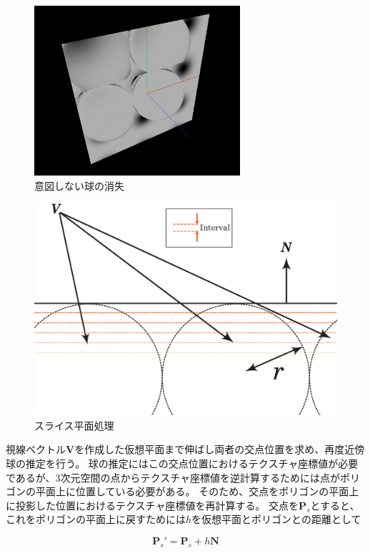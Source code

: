 \begin{figure}[htbp]
  \centering
  \includegraphics[width=3.0in]{./img/four_sphere_negative.png}
  \caption{意図しない球の消失}
  \label{FFourSphereNegative}
\end{figure}
\begin{figure}[htbp]
  \centering
  \includegraphics[width=4.5in]{./img/find_first_sphere2.eps}
  \caption{スライス平面処理}
  \label{FFindFirstSphere}
\end{figure}


視線ベクトル$\bm{V}$を作成した仮想平面まで伸ばし両者の交点位置を求め、再度近傍球の推定を行う。
球の推定にはこの交点位置におけるテクスチャ座標値が必要であるが、3次元空間の点からテクスチャ座標値を逆計算するためには点がポリゴンの平面上に位置している必要がある。
そのため、交点をポリゴンの平面上に投影した位置におけるテクスチャ座標値を再計算する。
交点を$\bm{P}_s$とすると、これをポリゴンの平面上に戻すためには$h$を仮想平面とポリゴンとの距離として

\begin{equation}
\bm{P}_s' = \bm{P}_s + h\bm{N}
\label{EPsdash}
\end{equation}

